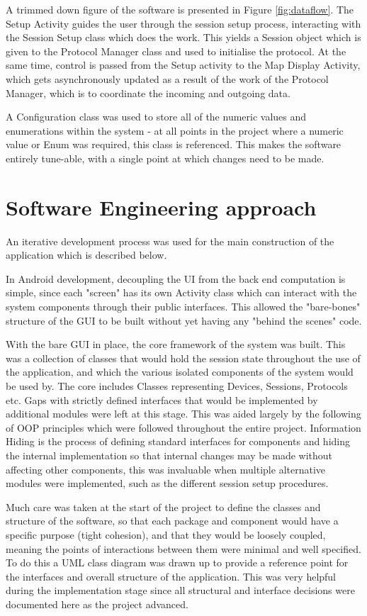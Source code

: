 A trimmed down figure of the software is presented in Figure \ref{fig:dataflow}. The Setup Activity guides the user through the session setup process, interacting with the Session Setup class which does the work. This yields a Session object which is given to the Protocol Manager class and used to initialise the protocol. At the same time, control is passed from the Setup activity to the Map Display Activity, which gets asynchronously updated as a result of the work of the Protocol Manager, which is to coordinate the incoming and outgoing data.

A Configuration class was used to store all of the numeric values and enumerations within the system - at all points in the project where a numeric value or Enum was required, this class is referenced. This makes the software entirely tune-able, with a single point at which changes need to be made.

\section{Software Engineering approach}
An iterative development process was used for the main construction of the application which is described below.

In Android development, decoupling the UI from the back end computation is simple, since each "screen" has its own Activity class which can interact with the system components through their public interfaces. This allowed the "bare-bones" structure of the GUI to be built without yet having any "behind the scenes" code.

With the bare GUI in place, the core framework of the system was built. This was a collection of classes that would hold the session state throughout the use of the application, and which the various isolated components of the system would be used by. The core includes Classes representing Devices, Sessions, Protocols etc.
Gaps with strictly defined interfaces that would be implemented by additional modules were left at this stage. This was aided largely by the following of OOP principles which were followed throughout the entire project.
Information Hiding is the process of defining standard interfaces for components and hiding the internal implementation so that internal changes may be made without affecting other components, this was invaluable when multiple alternative modules were implemented, such as the different session setup procedures.

Much care was taken at the start of the project to define the classes and structure of the software, so that each package and component would have a specific purpose (tight cohesion), and that they would be loosely coupled, meaning the points of interactions between them were minimal and well specified. To do this a UML class diagram was drawn up to provide a reference point for the interfaces and overall structure of the application. This was very helpful during the implementation stage since all structural and interface decisions were documented here as the project advanced.

